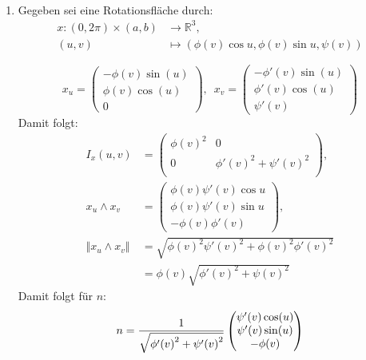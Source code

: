 \begin{solution}
  \
  \begin{enumerate}[label= (\alph*)] 
    \item Gegeben sei eine Rotationsfläche durch:
    \begin{align*}
      x:(0,2\pi) \times (a,b) &\to \mathbb{R}^3, \\
      (u,v) &\mapsto (\phi(v)\cos u, \phi(v)\sin u, \psi(v))
    \end{align*}
    
    \begin{equation*}
      x_u = \begin{pmatrix}
        -\phi(v)\sin(u) \\ \phi(v)\cos(u) \\ 0 
      \end{pmatrix}, \enspace
      x_v = \begin{pmatrix}
        -\phi'(v)\sin(u) \\ \phi'(v)\cos(u) \\ \psi'(v) 
      \end{pmatrix} 
    \end{equation*}
    Damit folgt: 
    \begin{align*}
      I_x(u,v) &= 
      \begin{pmatrix}
        {\phi(v)}^2 & 0 \\
        0 & {\phi'(v)}^2 + {\psi'(v)}^2 \\
      \end{pmatrix}, \\
      x_u \land x_v &= 
      \begin{pmatrix}
        \phi(v) \psi'(v) \cos u \\
        \phi(v) \psi'(v) \sin u \\
        -\phi(v) \phi'(v)
      \end{pmatrix}, \\
      \Vert x_u \land x_v \Vert &= \sqrt{ {\phi(v)}^2 {\psi'(v)}^2 + {\phi(v)}^2 {\phi'(v)}^2} \\
      &= \phi(v) \sqrt{ {\phi'(v)}^2 + {\psi(v)}^2}
    \end{align*}
    Damit folgt für \( n \):
    \begin{equation*}
      \centering
      n = \frac{1}{\sqrt{ {\phi'(v)}^2 + {\psi'(v)}^2}} \begin{pmatrix}
        \psi'(v) \cos(u) \\
        \psi'(v) \sin(u) \\
        -\phi(v)
      \end{pmatrix}

\end{equation*}
\end{enumerate}
\end{solution}
